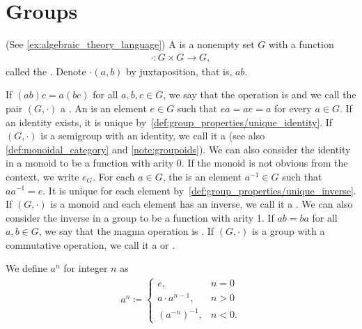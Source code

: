 \section{Groups}\label{sec:groups}

\begin{definition}\label{def:group}(See \cref{ex:algebraic_theory_language})
  A  is a nonempty set \( G \) with a function 
  \begin{align*}
    \cdot: G \times G \to G,
  \end{align*}
  called the . Denote \( \cdot(a, b) \) by juxtaposition, that is, \( ab \).

  \begin{description}
     If \( (ab)c = a(bc) \) for all \( a, b, c \in G \), we say that the operation is  and we call the pair \( (G, \cdot) \) a .
     An  is an element \( e \in G \) such that \( ea = ae = a \) for every \( a \in G \). If an identity exists, it is unique by~\cref{def:group_properties/unique_identity}. If \( (G, \cdot) \) is a semigroup with an identity, we call it a  (see also \cref{def:monoidal_category} and \cref{note:groupoids}). We can also consider the identity in a monoid to be a function with arity 0. If the monoid is not obvious from the context, we write \( e_G \).
     For each \( a \in G \), the  is an element \( a^{-1} \in G \) such that \( aa^{-1} = e \). It is unique for each element by~\cref{def:group_properties/unique_inverse}. If \( (G, \cdot) \) is a monoid and each element has an inverse, we call it a . We can also consider the inverse in a group to be a function with arity 1.
     If \( ab = ba \) for all \( a, b \in G \), we say that the magma operation is . If \( (G, \cdot) \) is a group with a commutative operation, we call it a  or .
  \end{description}

  We define \( a^n \) for integer \( n \) as
  \begin{align*}
    a^n \coloneqq \begin{cases}
      e, &n = 0 \\
      a \cdot a^{n-1}, &n > 0 \\
      (a^{-n})^{-1}, &n < 0.
    \end{cases}
  \end{align*}


\end{definition}

